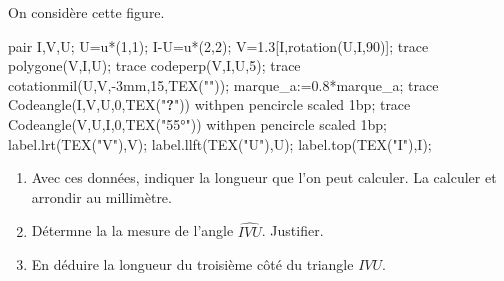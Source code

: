 \begin{exercice*}
    On considère cette figure.

    \begin{center}
        \begin{Geometrie}
            pair I,V,U;
            U=u*(1,1);
            I-U=u*(2,2);
            V=1.3[I,rotation(U,I,90)];
            trace polygone(V,I,U);
            trace codeperp(V,I,U,5);
            trace cotationmil(U,V,-3mm,15,TEX(""));
            marque_a:=0.8*marque_a;                
            trace Codeangle(I,V,U,0,TEX("\textbf{?}")) withpen pencircle scaled 1bp;
            trace Codeangle(V,U,I,0,TEX("\ang{55}")) withpen pencircle scaled 1bp;
            label.lrt(TEX("V"),V);
            label.llft(TEX("U"),U);
            label.top(TEX("I"),I);
        \end{Geometrie}
    \end{center}
    \begin{enumerate}
        \item Avec ces données, indiquer la longueur que l'on peut calculer. La calculer et arrondir au millimètre.
        \item Détermne la la mesure de l'angle $\widehat{IVU}$. Justifier.
        \item En déduire la longueur du troisième côté du triangle $IVU$.
    \end{enumerate}
\end{exercice*}
